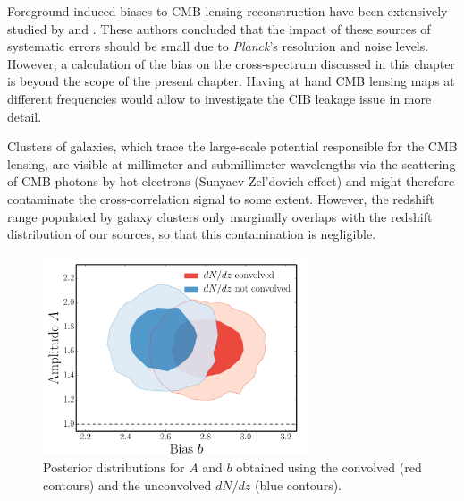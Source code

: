 Foreground induced biases to CMB lensing reconstruction have been extensively studied by \cite{VanEngelen2014} and \cite{Osborne2014}. These authors concluded that the impact of these sources of systematic errors should be small due to \emph{Planck}'s resolution and noise levels. However, a calculation of the bias on the cross-spectrum discussed in this chapter is beyond the scope of the present chapter.  Having at hand \gls{CMB} lensing maps at different frequencies would allow to investigate the CIB leakage issue in more detail.

Clusters of galaxies, which trace the large-scale potential responsible for the \gls{CMB} lensing, are visible at millimeter and submillimeter wavelengths via the scattering of \gls{CMB} photons by hot electrons {(Sunyaev-Zel'dovich effect)} and might therefore contaminate the cross-correlation signal to some extent. However, the redshift range populated by galaxy clusters only marginally overlaps with the redshift distribution of our sources, so that this contamination is negligible.

\begin{figure} %
\centering %
\includegraphics[width=0.7\textwidth]{Chapter3/Images/f19}
\caption{Posterior distributions for $A$ and $b$ obtained using the convolved (red contours) and the unconvolved $dN/dz$  (blue contours).  \label{fig:kg_gg_un_convolved_pdf}}
\end{figure}

